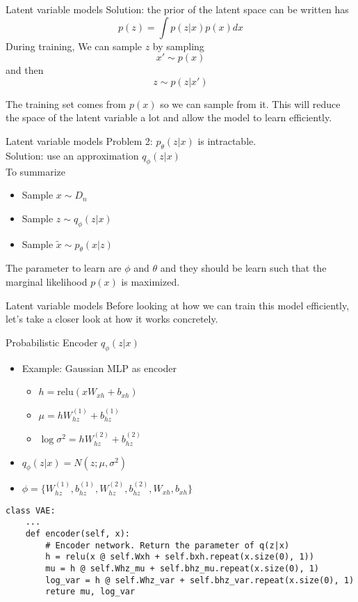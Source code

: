 \documentclass{beamer}
\newcommand{\relu}{\mathrm{relu}}
\begin{document}
\begin{frame}{Latent variable models}
Solution: the prior of the latent space can be written has
\[
p(z) = \int p(z|x) p(x) dx
\]
During training, We can sample $z$ by sampling \\
\[
x'\sim p(x)
\]
and then 
\[z\sim p(z|x')\]

 The training set comes from $p(x)$ so we can sample from it. This will reduce the space of the latent variable a lot and allow the model to learn efficiently.
\end{frame}

\begin{frame}{Latent variable models}
Problem 2: $p_\theta(z|x)$ is intractable. \\

Solution: use an approximation $q_\phi(z|x)$\\

To summarize
\begin{itemize}
	\item Sample $x \sim D_n$
	\item Sample $z \sim q_\phi(z|x)$
	\item Sample $\tilde{x} \sim p_\theta(x|z)$
\end{itemize}
The parameter to learn are $\phi$ and $\theta$ and they should be learn such that the marginal likelihood $p(x)$ is maximized.
\end{frame}

\begin{frame}{Latent variable models}
	Before looking at how we can train this model efficiently, let's take a closer look at how it works concretely.
\end{frame}

\begin{frame}[fragile]{Probabilistic Encoder $q_\phi(z|x)$}
\begin{itemize}
	\item Example: Gaussian MLP as encoder
	\begin{itemize}
		\item $h = \relu\left(x W_{xh}+b_{xh}\right)$
		\item $\mu = h W^{(1)}_{hz}+b^{(1)}_{hz}$
		\item $\log \sigma^2 = h W^{(2)}_{hz}+b^{(2)}_{hz}$
	\end{itemize}
	\item $q_\phi(z|x)=N(z;\mu, \sigma^2)$
	\item $\phi = \{W^{(1)}_{hz}, b^{(1)}_{hz}, W^{(2)}_{hz}, b^{(2)}_{hz}, W_{xh}, b_{xh}\}$
\end{itemize}
\begin{verbatim}
class VAE:
    ...
    def encoder(self, x):
        # Encoder network. Return the parameter of q(z|x)
        h = relu(x @ self.Wxh + self.bxh.repeat(x.size(0), 1))  
        mu = h @ self.Whz_mu + self.bhz_mu.repeat(x.size(0), 1)      
        log_var = h @ self.Whz_var + self.bhz_var.repeat(x.size(0), 1)
        reture mu, log_var
\end{verbatim}
\end{frame}
\end{document}
